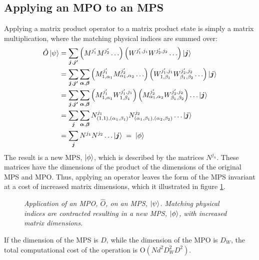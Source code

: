 \subsection{Applying an MPO to an MPS}
Applying a matrix product operator to a matrix product state is simply a matrix multiplication, where the matching physical indices are summed over:
\begin{align}
	\hat{O} \ket{\psi} &= \sum_{\boldsymbol{j},\boldsymbol{j'}} \left( M^{ j_1 '} M^{j_2 ' } \ldots \right) \left( W^{j_1 ' , j_1} W^{j_2 ' , j_2} \ldots \right) \ket{\boldsymbol{j}} \nonumber \\
	&= \sum_{\boldsymbol{j},\boldsymbol{j'}} \sum_{\boldsymbol{\alpha},\boldsymbol{\beta}} \left( M_{1, \alpha_1}^{ j_1 '} M_{\alpha_1, \alpha_2}^{j_2 '} \ldots \right) \left( W_{1, \beta_1}^{j_1 ' , j_1 } W_{\beta_1, \beta_2}^{j_2 ', j_2 } \ldots \right) \ket{\boldsymbol{j}} \nonumber \\
&= \sum_{\boldsymbol{j},\boldsymbol{j'}} \sum_{\boldsymbol{\alpha},\boldsymbol{\beta}} \left( M_{1, \alpha_1}^{ j_1 '} W_{1, \beta_1}^{j_1 ' , j_1} \right) \left( M_{\alpha_1, \alpha_2}^{j_2 '}  W_{\beta_1, \beta_2}^{j_2 ' , j_2} \right) \ldots \ket{\boldsymbol{j}} \nonumber \\
&= \sum_{\boldsymbol{j}} \sum_{\boldsymbol{\alpha},\boldsymbol{\beta}} N_{(1,1),(\alpha_1 , \beta_1)}^{j_1} N_{(\alpha_1 , \beta_1),(\alpha_2 , \beta_2)}^{j_2} \ldots \ket{\boldsymbol{j}} \nonumber \\
&= \sum_{\boldsymbol{j}} N^{j_1} N^{j_2} \ldots \ket{\boldsymbol{j}} \; = \; \ket{\phi} 
\end{align} 
The result is a new MPS, $\ket{\phi}$, which is described by the matrices $N^{j_n}$. These matrices have the dimensions of the product of the dimensions of the original MPS and MPO. Thus, applying an operator leaves the form of the MPS invariant at a cost of increased matrix dimensions, which it illustrated in figure \ref{fig:MPOcont}.
\begin{figure}[h!]
	\centering
	
	\caption{\textit{Application of an MPO, $\hat{O}$, on an MPS, $\ket{\psi}$. Matching physical indices are contracted resulting in a new MPS, $\ket{\phi}$, with increased matrix dimensions.}}
	\label{fig:MPOcont}
\end{figure}
If the dimension of the MPS is $D$, while the dimension of the MPO is $D_W$, the total computational cost of the operation is $\mathrm{O}(N d^2 D_W ^2 D^2)$.\cite{Schollwock, McCulloch}



